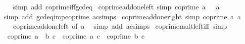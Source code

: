 \begin{isabellebody}
%
\isadelimproof
\ \ %
\endisadelimproof
%
\isatagproof
{}\isamarkupfalse%
\ {\isacharparenleft}{\kern0pt}simp\ add{\isacharcolon}{\kern0pt}\ coprime{\isacharunderscore}{\kern0pt}iff{\isacharunderscore}{\kern0pt}gcd{\isacharunderscore}{\kern0pt}eq{\isacharunderscore}{\kern0pt}{}{\isacharparenright}{\kern0pt}%
\endisatagproof
{\isafoldproof}%
%
\isadelimproof
\isanewline
%
\endisadelimproof
\isanewline
{}\isamarkupfalse%
\ coprime{\isacharunderscore}{\kern0pt}add{\isacharunderscore}{\kern0pt}one{\isacharunderscore}{\kern0pt}left\ {\isacharbrackleft}{\kern0pt}simp{\isacharbrackright}{\kern0pt}{\isacharcolon}{\kern0pt}\ {\isachardoublequoteopen}coprime\ {\isacharparenleft}{\kern0pt}a\ {\isacharplus}{\kern0pt}\ {}{\isacharparenright}{\kern0pt}\ a{\isachardoublequoteclose}\isanewline
%
\isadelimproof
\ \ %
\endisadelimproof
%
\isatagproof
{}\isamarkupfalse%
\ {\isacharparenleft}{\kern0pt}simp\ add{\isacharcolon}{\kern0pt}\ gcd{\isacharunderscore}{\kern0pt}eq{\isacharunderscore}{\kern0pt}{}{\isacharunderscore}{\kern0pt}imp{\isacharunderscore}{\kern0pt}coprime\ ac{\isacharunderscore}{\kern0pt}simps{\isacharparenright}{\kern0pt}%
\endisatagproof
{\isafoldproof}%
%
\isadelimproof
\isanewline
%
\endisadelimproof
\isanewline
{}\isamarkupfalse%
\ coprime{\isacharunderscore}{\kern0pt}add{\isacharunderscore}{\kern0pt}one{\isacharunderscore}{\kern0pt}right\ {\isacharbrackleft}{\kern0pt}simp{\isacharbrackright}{\kern0pt}{\isacharcolon}{\kern0pt}\ {\isachardoublequoteopen}coprime\ a\ {\isacharparenleft}{\kern0pt}a\ {\isacharplus}{\kern0pt}\ {}{\isacharparenright}{\kern0pt}{\isachardoublequoteclose}\isanewline
%
\isadelimproof
\ \ %
\endisadelimproof
%
\isatagproof
{}\isamarkupfalse%
\ coprime{\isacharunderscore}{\kern0pt}add{\isacharunderscore}{\kern0pt}one{\isacharunderscore}{\kern0pt}left\ {\isacharbrackleft}{\kern0pt}of\ a{\isacharbrackright}{\kern0pt}\ \isamarkupfalse%
\ {\isacharparenleft}{\kern0pt}simp\ add{\isacharcolon}{\kern0pt}\ ac{\isacharunderscore}{\kern0pt}simps{\isacharparenright}{\kern0pt}%
\endisatagproof
{\isafoldproof}%
%
\isadelimproof
\isanewline
%
\endisadelimproof
\isanewline
{}\isamarkupfalse%
\ coprime{\isacharunderscore}{\kern0pt}mult{\isacharunderscore}{\kern0pt}left{\isacharunderscore}{\kern0pt}iff\ {\isacharbrackleft}{\kern0pt}simp{\isacharbrackright}{\kern0pt}{\isacharcolon}{\kern0pt}\isanewline
\ \ {\isachardoublequoteopen}coprime\ {\isacharparenleft}{\kern0pt}a\ {\isacharasterisk}{\kern0pt}\ b{\isacharparenright}{\kern0pt}\ c\ {\isasymlongleftrightarrow}\ coprime\ a\ c\ {\isasymand}\ coprime\ b\ c{\isachardoublequoteclose}\isanewline

\end{isabellebody}
